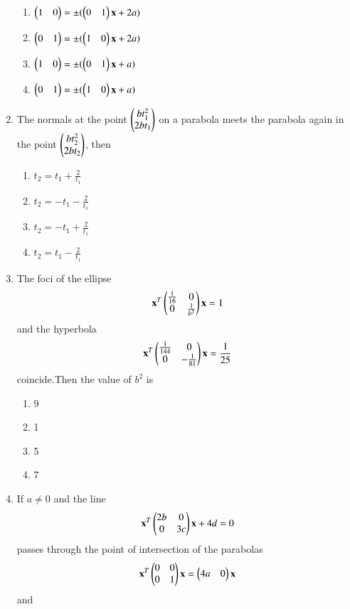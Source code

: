\begin{enumerate}[label=\arabic*.,ref=\thesubsection.\theenumi]
    \begin{enumerate}
    \item $\begin{pmatrix}1&0\end{pmatrix}=\pm{(\ensuremath{\begin{pmatrix}0&1\end{pmatrix}}\mathbf{x}+2a)}$
    \item $\begin{pmatrix}0&1\end{pmatrix}=\pm{(\ensuremath{\begin{pmatrix}1&0\end{pmatrix}}\mathbf{x}+2a)}$
    \item $\begin{pmatrix}1&0\end{pmatrix}=\pm{(\ensuremath{\begin{pmatrix}0&1\end{pmatrix}}\mathbf{x}+a)}$
    \item $\begin{pmatrix}0&1\end{pmatrix}=\pm{(\ensuremath{\begin{pmatrix}1&0\end{pmatrix}}\mathbf{x}+a)}$
    \end{enumerate}
    \item The normals at the point $\begin{pmatrix}bt_1^2\\2bt_1\end{pmatrix}$ on a parabola meets the parabola again in the point $\begin{pmatrix}bt_2^2\\2bt_2\end{pmatrix}$, then
    \begin{enumerate}
    \item $t_2=t_1+\frac{2}{t_1}$
    \item $t_2=-t_1-\frac{2}{t_1}$
    \item $t_2=-t_1+\frac{2}{t_1}$
    \item $t_2=t_1-\frac{2}{t_1}$
    \end{enumerate}
    \item The foci of the ellipse
    \begin{align}
    \mathbf{x}^T\begin{pmatrix}\frac{1}{16}&0\\0&\frac{1}{b^2}\end{pmatrix}\mathbf{x}=1 
    \end{align}and the hyperbola
    \begin{align}
    \mathbf{x}^T\begin{pmatrix}\frac{1}{144}&0\\0&-\frac{1}{81}\end{pmatrix}\mathbf{x}=\frac{1}{25}
    \end{align} coincide.Then the value of $b^2$ is
    \begin{enumerate}
    \item 9
    \item 1
    \item 5
    \item 7
    \end{enumerate}
    \item If $a\neq0$ and the line
    \begin{align}
    \mathbf{x}^T\begin{pmatrix}2b&0\\0&3c\end{pmatrix}\mathbf{x}+4d=0
    \end{align} passes through the point of intersection of the parabolas
    \begin{align}
    \mathbf{x}^T\begin{pmatrix}0&0\\0&1\end{pmatrix}\mathbf{x}=\begin{pmatrix}4a&0\end{pmatrix}\mathbf{x}
    \end{align}and

\end{enumerate}
